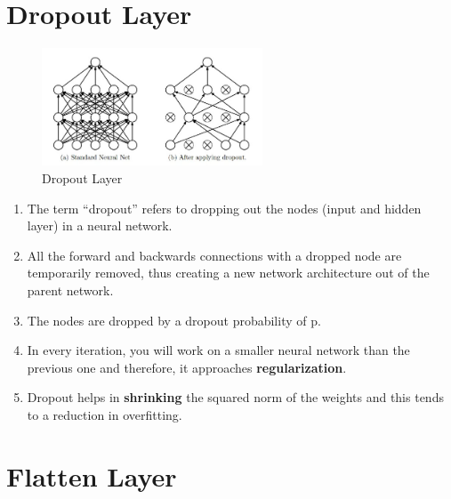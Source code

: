 
\section{Dropout Layer \cite{gfg-dropout-in-neural-networks,medium/towardsdatascience.com/dropout-in-neural-networks-47a162d621d9}}\label{nn: Dropout Layer}

\begin{figure}[H]
    \centering
    \includegraphics[width=\linewidth, height=3.5cm, keepaspectratio]{Pictures/layers/dropout.jpg}
    \caption{Dropout Layer \cite{medium/towardsdatascience.com/dropout-in-neural-networks-47a162d621d9}}
\end{figure}

\begin{enumerate}
    \item The term “dropout” refers to dropping out the nodes (input and hidden layer) in a neural network. 
    
    \item All the forward and backwards connections with a dropped node are temporarily removed, thus creating a new network architecture out of the parent network. 
    
    \item The nodes are dropped by a dropout probability of p.

    \item In every iteration, you will work on a smaller neural network than the previous one and therefore, it approaches \textbf{regularization}.

    \item Dropout helps in \textbf{shrinking} the squared norm of the weights and this tends to a reduction in overfitting.
\end{enumerate}




\section{Flatten Layer \cite{gfg/what-is-a-neural-network-flatten-layer}}\label{Flatten Layer}

